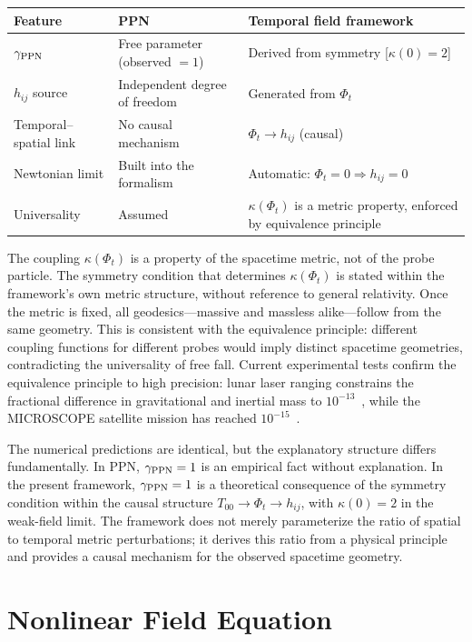 \documentclass[12pt]{article}
\begin{document}
\begin{center}
\small
\begin{tabular}{p{3.0cm} p{5.1cm} p{5.7cm}}
\hline
Feature & PPN & Temporal field framework \\
\hline
$\gamma_{\rm PPN}$ & Free parameter (observed $=1$) & Derived from symmetry [$\kappa(0) = 2$] \\
$h_{ij}$ source & Independent degree of freedom & Generated from $\Phi_t$ \\
Temporal--spatial link & No causal mechanism & $\Phi_t \to h_{ij}$ (causal) \\
Newtonian limit & Built into the formalism & Automatic: $\Phi_t=0 \Rightarrow h_{ij}=0$ \\
Universality & Assumed & $\kappa(\Phi_t)$ is a metric property, enforced by equivalence principle \\
\hline
\end{tabular}
\end{center}

The coupling $\kappa(\Phi_t)$ is a property of the spacetime metric, not of the probe particle. The symmetry condition that determines $\kappa(\Phi_t)$ is stated within the framework's own metric structure, without reference to general relativity. Once the metric is fixed, all geodesics---massive and massless alike---follow from the same geometry. This is consistent with the equivalence principle: different coupling functions for different probes would imply distinct spacetime geometries, contradicting the universality of free fall. Current experimental tests confirm the equivalence principle to high precision: lunar laser ranging constrains the fractional difference in gravitational and inertial mass to $10^{-13}$~\cite{Williams2012}, while the MICROSCOPE satellite mission has reached $10^{-15}$~\cite{Touboul2022}.

The numerical predictions are identical, but the explanatory structure differs fundamentally. In PPN, $\gamma_{\rm PPN} = 1$ is an empirical fact without explanation. In the present framework, $\gamma_{\rm PPN} = 1$ is a theoretical consequence of the symmetry condition within the causal structure $T_{00} \to \Phi_t \to h_{ij}$, with $\kappa(0) = 2$ in the weak-field limit. The framework does not merely parameterize the ratio of spatial to temporal metric perturbations; it derives this ratio from a physical principle and provides a causal mechanism for the observed spacetime geometry.


\section{Nonlinear Field Equation}
\label{sec:field_equation}
\end{document}
